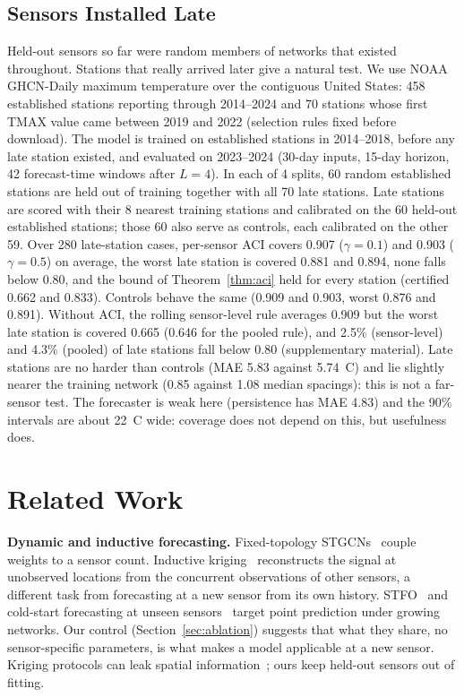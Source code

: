 \documentclass[journal,twoside,web]{ieeecolor}
\begin{document}
\subsection{Sensors Installed Late}
\label{sec:late}
Held-out sensors so far were random members of networks that existed throughout. Stations that really arrived later
give a natural test. We use NOAA GHCN-Daily maximum temperature over the contiguous United States: 458 established
stations reporting through 2014--2024 and 70 stations whose first TMAX value came between 2019 and 2022 (selection
rules fixed before download). The model is trained on established stations in 2014--2018, before any late station
existed, and evaluated on 2023--2024 (30-day inputs, 15-day horizon, 42 forecast-time windows after $L=4$). In each of 4
splits, 60 random established stations are held out of training together with all 70 late stations. Late stations are
scored with their 8 nearest training stations and calibrated on the 60 held-out established stations; those 60 also
 serve as controls, each calibrated on the other 59.
Over 280 late-station cases, per-sensor ACI covers 0.907 ($\gamma=0.1$) and
0.903 ($\gamma=0.5$) on average, the worst late station is covered 0.881 and 0.894, none falls below 0.80, and the
bound of Theorem~\ref{thm:aci} held for every station (certified 0.662 and 0.833). Controls behave the same (0.909 and
0.903, worst 0.876 and 0.891). Without ACI, the rolling sensor-level rule averages 0.909 but the worst late station is
covered 0.665 (0.646 for the pooled rule), and 2.5\% (sensor-level) and 4.3\% (pooled) of late stations fall below 0.80
(supplementary material). Late stations are no harder than controls (MAE 5.83 against 5.74~\textdegree C) and lie slightly nearer the training network (0.85 against 1.08 median spacings): this is not a far-sensor test.  The
forecaster is weak here (persistence has MAE 4.83) and the 90\% intervals are about 22~\textdegree C wide: coverage
does not depend on this, but usefulness does.
\section{Related Work}
\label{sec:related}

\textbf{Dynamic and inductive forecasting.} Fixed-topology STGCNs~\cite{yu2018stgcn} couple weights to a sensor
count. Inductive kriging~\cite{ignnk2020} reconstructs the signal at unobserved locations from the concurrent
observations of other sensors, a different task from forecasting at a new sensor from its own history. STFO~\cite{stfo2026} and cold-start forecasting at unseen
sensors~\cite{coldstart_unseen2026} target point prediction under growing networks. Our control (Section~\ref{sec:ablation}) suggests that what they share, no sensor-specific parameters, is what makes a model applicable at a new sensor.  Kriging protocols can leak spatial information~\cite{yang2026leakagefree}; ours keep held-out sensors out of fitting.
\end{document}
